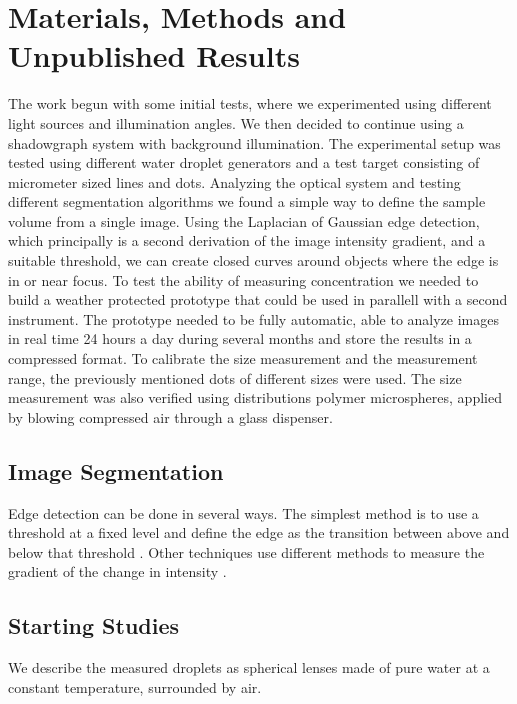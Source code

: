 
\chapter{Materials, Methods and Unpublished Results}
\label{chap:methods}

The work begun with some initial tests, where we experimented using different light sources and illumination angles. We then decided to continue using a shadowgraph system with background illumination. The experimental setup was tested using different water droplet generators and a test target consisting of micrometer sized lines and dots. Analyzing the optical system and testing different segmentation algorithms we found a simple way to define the sample volume from a single image. Using the Laplacian of Gaussian edge detection, which principally is a second derivation of the image intensity gradient, and a suitable threshold, we can create closed curves around objects where the edge is in or near focus. To test the ability of measuring concentration we needed to build a weather protected prototype that could be used in parallell with a second instrument. The prototype needed to be fully automatic, able to analyze images in real time 24 hours a day during several months and store the results in a compressed format. To calibrate the size measurement and the measurement range, the previously mentioned dots of different sizes were used. The size measurement was also verified using distributions polymer microspheres, applied by blowing compressed air through a glass dispenser.

\section{Image Segmentation}

Edge detection can be done in several ways. The simplest method is to use a threshold at a fixed level and define the edge as the transition between above and below that threshold \cite{gonz2002}. Other techniques use different methods to measure the gradient of the change in intensity \cite{canny1986,marr1980}.

\section{Starting Studies}

We describe the measured droplets as spherical lenses made of pure water at a constant temperature, surrounded by air. 

